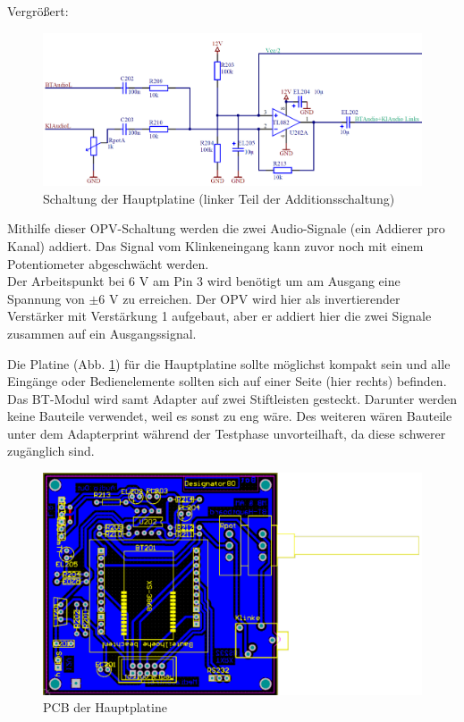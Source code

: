 Vergrößert:
\begin{figure} [H]
	\centering
	\includegraphics[width=1\textwidth]{img/BTModul/hauptboard_sch2_zoom.png}
	\caption{Schaltung der Hauptplatine (linker Teil der Additionsschaltung)}
\end{figure}
Mithilfe dieser OPV-Schaltung werden die zwei Audio-Signale (ein Addierer pro Kanal) addiert.
Das Signal vom Klinkeneingang kann zuvor noch mit einem Potentiometer abgeschwächt werden.
\\
Der Arbeitspunkt bei 6 V am Pin 3 wird benötigt um am Ausgang eine Spannung von $\pm$6 V zu erreichen. Der OPV wird hier als invertierender Verstärker mit Verstärkung 1 aufgebaut, aber er addiert hier die zwei Signale zusammen auf ein Ausgangssignal.
\newpage

Die Platine (Abb. \ref {fig:5.3.8.3.1}) für die Hauptplatine sollte möglichst kompakt sein und alle Eingänge oder Bedienelemente sollten sich auf einer Seite (hier rechts) befinden.
Das BT-Modul wird samt Adapter auf zwei Stiftleisten gesteckt.
Darunter werden keine Bauteile verwendet, weil es sonst zu eng wäre.
Des weiteren wären Bauteile unter dem Adapterprint während der Testphase unvorteilhaft, da diese schwerer zugänglich sind.
\begin{figure} [H]
	\centering
	\includegraphics[width=1\textwidth]{img/BTModul/hauptboard_pcb.png}
	\caption{PCB der Hauptplatine}\label {fig:5.3.8.3.1}
\end{figure}
\newpage


